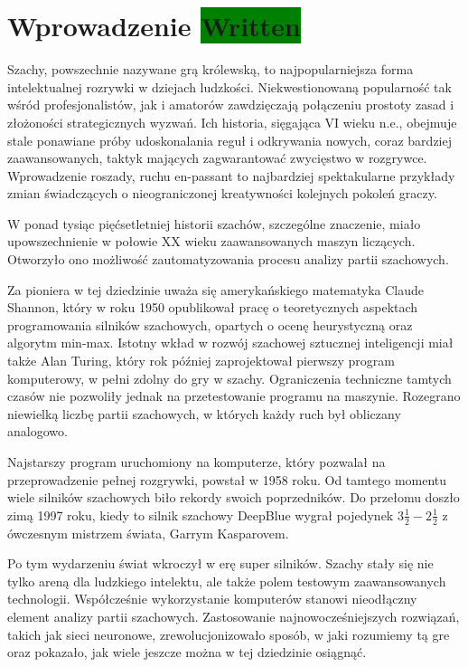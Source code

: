 \section{Wprowadzenie \colorbox{green}{Written}}
\label{sec:wprowadzenie}

Szachy, powszechnie nazywane grą królewską, to najpopularniejsza forma intelektualnej rozrywki w dziejach ludzkości.
Niekwestionowaną popularność tak wśród profesjonalistów, jak i amatorów zawdzięczają połączeniu prostoty zasad i złożoności strategicznych wyzwań.
Ich historia, sięgająca VI wieku n.e., obejmuje stale ponawiane próby udoskonalania reguł i odkrywania nowych, coraz bardziej zaawansowanych, taktyk mających zagwarantować zwycięstwo w rozgrywce.
Wprowadzenie roszady, ruchu en-passant to najbardziej spektakularne przykłady zmian świadczących o nieograniczonej kreatywności kolejnych pokoleń graczy.

W ponad tysiąc pięćsetletniej historii szachów, szczególne znaczenie, miało upowszechnienie w połowie XX wieku zaawansowanych maszyn liczących.
Otworzyło ono możliwość zautomatyzowania procesu analizy partii szachowych.


Za pioniera w tej dziedzinie uważa się amerykańskiego  matematyka Claude Shannon, który w roku 1950 opublikował pracę o teoretycznych aspektach programowania silników szachowych, opartych o ocenę heurystyczną oraz algorytm min-max.
Istotny wkład w rozwój szachowej sztucznej inteligencji miał także  Alan Turing, który rok później zaprojektował pierwszy program komputerowy, w pełni zdolny do gry w szachy.
Ograniczenia techniczne tamtych czasów nie pozwoliły jednak na przetestowanie programu na maszynie.
Rozegrano niewielką liczbę partii szachowych, w których każdy ruch był obliczany analogowo.


Najstarszy program uruchomiony na komputerze, który pozwalał na przeprowadzenie pełnej rozgrywki, powstał w 1958 roku.
Od tamtego momentu wiele silników szachowych biło rekordy swoich poprzedników.
Do przełomu doszło zimą 1997 roku, kiedy to silnik szachowy DeepBlue wygrał pojedynek $3\frac{1}{2} - 2\frac{1}{2}$ z ówczesnym mistrzem świata, Garrym Kasparovem.


Po tym wydarzeniu świat wkroczył w erę super silników.
Szachy stały się nie tylko areną dla ludzkiego intelektu, ale także polem testowym zaawansowanych technologii.
Współcześnie wykorzystanie komputerów stanowi nieodłączny element analizy partii szachowych.
Zastosowanie najnowocześniejszych rozwiązań, takich jak sieci neuronowe, zrewolucjonizowało sposób, w jaki rozumiemy tą gre oraz pokazało, jak wiele jeszcze można w tej dziedzinie osiągnąć.